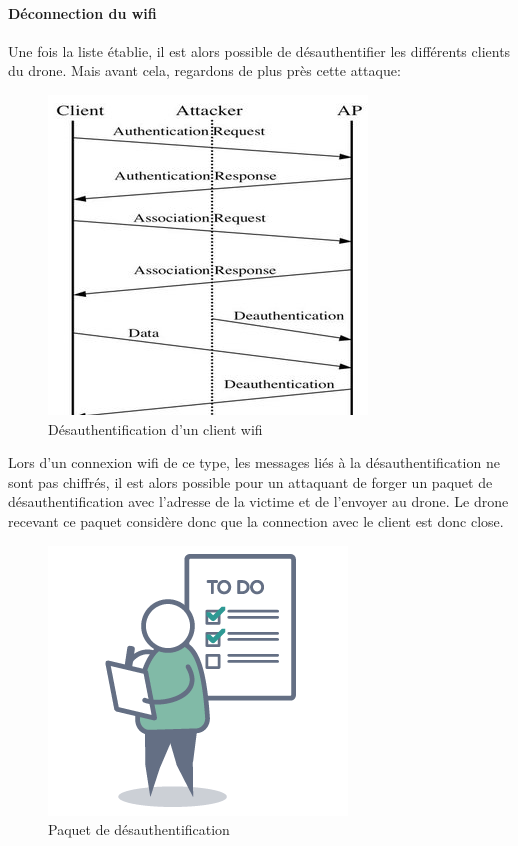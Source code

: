 \paragraph{Déconnection du wifi}
Une fois la liste établie, il est alors possible de désauthentifier les différents clients du drone. Mais avant cela, regardons de plus près cette attaque:

\begin{figure}[H]
  \centering
  \includegraphics[scale=1.3]{images/deauth}
  \caption{Désauthentification d'un client wifi}
\end{figure}

Lors d'un connexion wifi de ce type, les messages liés à la désauthentification ne sont pas chiffrés, il est alors possible pour un attaquant de forger un paquet de désauthentification avec l'adresse de la victime et de l'envoyer au drone. Le drone recevant ce paquet considère donc que la connection avec le client est donc close.

\begin{figure}[H]
  \centering
  \includegraphics[scale=0.3]{images/todo}
  \caption{Paquet de désauthentification}
\end{figure}

